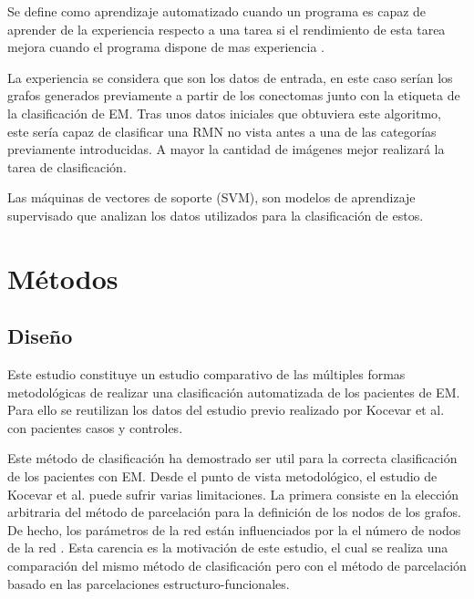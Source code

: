 \documentclass[fleqn,10pt]{UICArticle} %
\begin{document}
Se define como aprendizaje automatizado cuando un programa es capaz de aprender de la experiencia respecto a una tarea si el rendimiento de esta tarea mejora cuando el programa dispone de mas experiencia \cite{Friedman1997}.

La experiencia se considera que son los datos de entrada, en este caso serían los grafos generados previamente a partir de los conectomas junto con la etiqueta de la clasificación de EM. Tras unos datos iniciales que obtuviera este algoritmo, este sería capaz de clasificar una RMN no vista antes a una de las categorías previamente introducidas. A mayor la cantidad de imágenes mejor realizará la tarea de clasificación.

Las máquinas de vectores de soporte (SVM), son modelos de aprendizaje supervisado que analizan los datos utilizados para la clasificación de estos.


 

\section{Métodos}

\subsection{Diseño}
Este estudio constituye un estudio comparativo de las múltiples formas metodológicas de realizar una clasificación automatizada de los pacientes de EM. Para ello se reutilizan los datos del estudio previo realizado por Kocevar et al. \cite{Kocevar2016} con pacientes casos y controles.

Este método de clasificación ha demostrado ser util para la correcta clasificación de los pacientes con EM. Desde el punto de vista metodológico, el estudio de Kocevar et al. \cite{Kocevar2016} puede sufrir varias limitaciones. La primera consiste en la elección arbitraria del método de parcelación para la definición de los nodos de los grafos. De hecho, los parámetros de la red están influenciados por la el número de nodos de la red \cite{Zalesky2010}. Esta carencia es la motivación de este estudio, el cual se realiza una comparación del mismo método de clasificación pero con el método de parcelación basado en las parcelaciones estructuro-funcionales.
\end{document}
